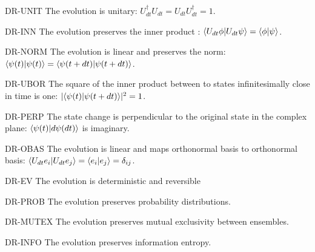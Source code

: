 \begin{condition}{DR-UNIT}
	The evolution is unitary: $U^{\dagger}_{dt} U_{dt} = U_{dt} U^{\dagger}_{dt} = 1$. 
\end{condition}

\begin{condition}{DR-INN}
	The evolution preserves the inner product : $\langle U_{dt} \phi | U_{dt} \psi\rangle =\langle  \phi | \psi \rangle$.
\end{condition}

\begin{condition}{DR-NORM}
	The evolution is linear and preserves the norm: $\langle \psi(t) | \psi(t) \rangle = \langle \psi(t+dt) | \psi(t+dt) \rangle$.
\end{condition}

\begin{condition}{DR-UBOR}
	The square of the inner product between to states infinitesimally close in time is one: $|\langle \psi(t) | \psi(t + dt) \rangle |^2 = 1$.
\end{condition}

\begin{condition}{DR-PERP}
	The state change is perpendicular to the original state in the complex plane: $\langle \psi(t) | d\psi(dt) \rangle$ is imaginary. 
\end{condition}

\begin{condition}{DR-OBAS}
	The evolution is linear and maps orthonormal basis to orthonormal basis: $\langle U_{d t} e_i | U_{d t} e_j \rangle = \langle e_i | e_j \rangle = \delta_{ij}$.
\end{condition}

\begin{condition}{DR-EV}
	The evolution is deterministic and reversible
\end{condition}

\begin{condition}{DR-PROB}
	The evolution preserves probability distributions.
\end{condition}

\begin{condition}{DR-MUTEX}
	The evolution preserves mutual exclusivity between ensembles.
\end{condition}

\begin{condition}{DR-INFO}
	The evolution preserves information entropy.
\end{condition}

